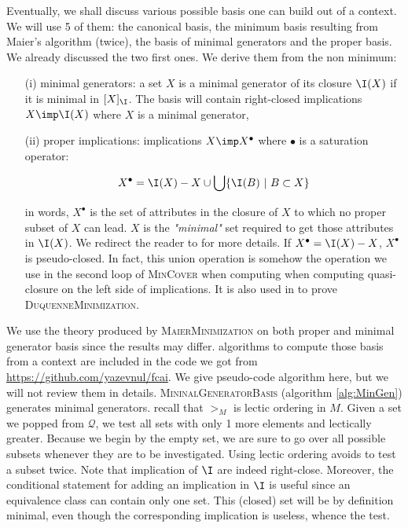 \vspace{1.2em}

Eventually, we shall discuss various possible basis one can build out of a context. We will use 5 of them: the canonical basis, the minimum basis resulting from Maier's algorithm (twice), the basis of minimal generators and the proper basis. We already discussed the two first ones. We derive them from the non minimum:
\begin{itemize}
	\item[(i)] minimal generators: a set $X$ is a minimal generator of its closure $\I(X)$ if it is minimal in $[ X]_{\I}$. The basis will contain
	right-closed implications $X \imp \I(X)$ where $X$ is a minimal generator,
	\item[(ii)] proper implications: implications $X \imp X^{\bullet}$ where 
	$\bullet$ is a saturation operator:
	
		\[ X^{\bullet} = \I(X) - X \cup \bigcup \{ \I(B) \ | \ B \subset X \} \]
		
	in words, $X^{\bullet}$ is the set of attributes in the closure of $X$ to
	which no proper subset of $X$ can lead. $X$ is the \textit{"minimal"} set required to get those attributes in $\I(X)$. We redirect the reader to 
	\cite{ganter_conceptual_2016} for more details. If $X^{\bullet} = \I(X) - X$, $X^{\bullet}$ is pseudo-closed. In fact, this union operation is somehow the operation we use in the second loop of \textsc{MinCover} when
	computing when computing quasi-closure on the left side of implications.
	It is also used in \cite{duquenne_variations_2007} to prove \textsc{DuquenneMinimization}.
\end{itemize}
\noindent We use the theory produced by \textsc{MaierMinimization} on both proper and minimal generator basis since the results may differ. algorithms to compute those basis from a context are included in the code we got from \url{https://github.com/yazevnul/fcai}. We give pseudo-code algorithm here, but we will not review them in details. \textsc{MininalGeneratorBasis} (algorithm \ref{alg:MinGen}) generates minimal 
generators. recall that $>_{M}$ is lectic ordering in $M$. Given a set we popped
from $\mathcal{Q}$, we test all sets with only 1 more elements and lectically
greater. Because we begin by the empty set, we are sure to go over all possible
subsets whenever they are to be investigated. Using lectic ordering avoids to
test a subset twice. Note that implication of $\I$ are indeed right-close.
Moreover, the conditional statement for adding an implication in $\I$ is useful
since an equivalence class can contain only one set. This (closed) set will
be by definition minimal, even though the corresponding implication is useless,
whence the test.

